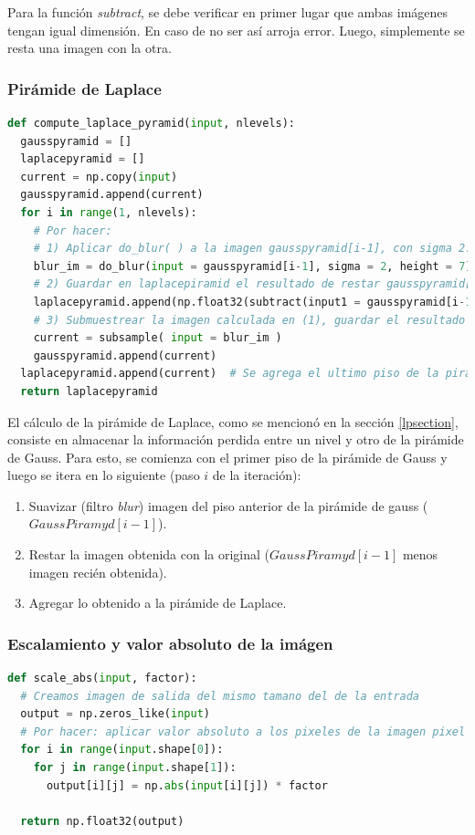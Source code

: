 \documentclass[12pt, letterpaper]{article}
\begin{document}
\par Para la función \textit{subtract}, se debe verificar en primer lugar que ambas imágenes tengan igual dimensión. En caso de no ser así arroja error. Luego, simplemente se resta una imagen con la otra. 


\subsubsection{Pirámide de Laplace}
\begin{lstlisting}[language=Python, label = lpCode, caption=Cómputo pirámide de Laplace.]
def compute_laplace_pyramid(input, nlevels):
  gausspyramid = []
  laplacepyramid = []
  current = np.copy(input)
  gausspyramid.append(current)
  for i in range(1, nlevels):
    # Por hacer:
    # 1) Aplicar do_blur( ) a la imagen gausspyramid[i-1], con sigma 2.0 y ancho 7
    blur_im = do_blur(input = gausspyramid[i-1], sigma = 2, height = 7)
    # 2) Guardar en laplacepiramid el resultado de restar gausspyramid[i - 1] y la imagen calculada en (1)
    laplacepyramid.append(np.float32(subtract(input1 = gausspyramid[i-1], input2 = blur_im)))
    # 3) Submuestrear la imagen calculada en (1), guardar el resultado en current
    current = subsample( input = blur_im )
    gausspyramid.append(current)
  laplacepyramid.append(current)  # Se agrega el ultimo piso de la piramide de Laplace
  return laplacepyramid
\end{lstlisting}

\par El cálculo de la pirámide de Laplace, como se mencionó en la sección \ref{lpsection}, consiste en almacenar la información perdida entre un nivel y otro de la pirámide de Gauss. Para esto, se comienza con el primer piso de la pirámide de Gauss y luego se itera en lo siguiente (paso $i$ de la iteración):

\begin{enumerate}
  \item Suavizar (filtro \textit{blur}) imagen del piso anterior de la pirámide de gauss ($GaussPiramyd[i-1]$). 
  \item Restar la imagen obtenida con la original ($GaussPiramyd[i-1]$ menos imagen recién obtenida).
  \item Agregar lo obtenido a la pirámide de Laplace. 
\end{enumerate}

\subsubsection{Escalamiento y valor absoluto de la imágen}
\begin{lstlisting}[language=Python, label = scaleabsCode, caption=Función \textit{scale\_abs}.]
def scale_abs(input, factor):
  # Creamos imagen de salida del mismo tamano del de la entrada
  output = np.zeros_like(input)
  # Por hacer: aplicar valor absoluto a los pixeles de la imagen pixel a pixel y luego escalar los pixeles usando el factor indicado
  for i in range(input.shape[0]):
    for j in range(input.shape[1]):
      output[i][j] = np.abs(input[i][j]) * factor
  
  return np.float32(output)
\end{lstlisting}
\end{document}
